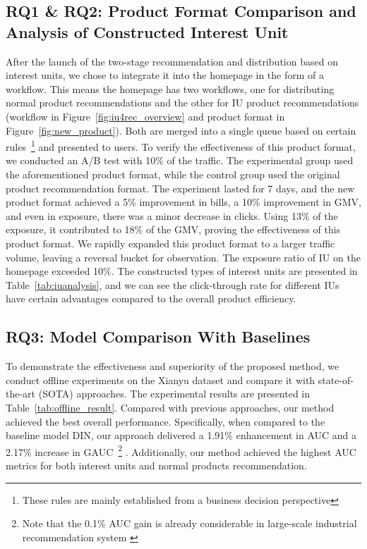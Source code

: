 \subsection{RQ1 \& RQ2: Product Format Comparison and Analysis of Constructed Interest Unit}
After the launch of the two-stage recommendation and distribution based on interest units, we chose to integrate it into the homepage in the form of a workflow. This means the homepage has two workflows, one for distributing normal product recommendations and the other for IU product recommendations (workflow in Figure~\ref{fig:iu4rec_overview} and product format in Figure~\ref{fig:new_product}). Both are merged into a single queue based on certain rules~\footnote{These rules are mainly established from a business decision perspective} and presented to users. To verify the effectiveness of this product format, we conducted an A/B test with 10\% of the traffic. The experimental group used the aforementioned product format, while the control group used the original product recommendation format. The experiment lasted for 7 days, and the new product format achieved a 5\% improvement in bills, a 10\% improvement in GMV, and even in exposure, there was a minor decrease in clicks. Using 13\% of the exposure, it contributed to 18\% of the GMV, proving the effectiveness of this product format. We rapidly expanded this product format to a larger traffic volume, leaving a reversal bucket for observation.
The exposure ratio of IU on the homepage exceeded 10\%. The constructed types of interest units are presented in Table~\ref{tab:iuanalysis}, and we can see the click-through rate for different IUs have certain advantages compared to the overall product efficiency.

\subsection{RQ3: Model Comparison With Baselines}
To demonstrate the effectiveness and superiority of the proposed method, we conduct offline experiments on the Xianyu dataset and compare it with state-of- the-art (SOTA) approaches. The experimental results are presented in Table~\ref{tab:offline_result}. 
Compared with previous approaches, our method achieved the best overall performance. Specifically, when compared to the baseline model DIN, our approach delivered a 1.91\% enhancement in AUC and a 2.17\% increase in GAUC~\footnote{Note that the 0.1\% AUC gain is already considerable in large-scale industrial recommendation system \cite{chang2023pepnet}}
. Additionally, our method achieved the highest AUC metrics for both interest units and normal products recommendation.


